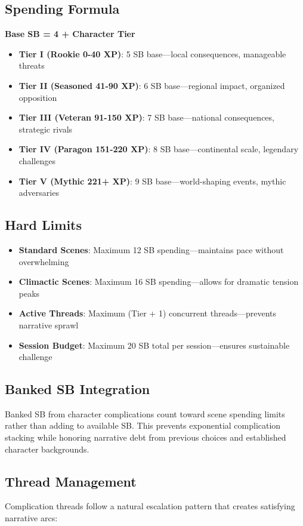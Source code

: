 \subsection*{Spending Formula}
\textbf{Base SB = 4 + Character Tier}
\begin{itemize}
    \item \textbf{Tier I (Rookie 0-40 XP)}: 5 SB base—local consequences, manageable threats
    \item \textbf{Tier II (Seasoned 41-90 XP)}: 6 SB base—regional impact, organized opposition
    \item \textbf{Tier III (Veteran 91-150 XP)}: 7 SB base—national consequences, strategic rivals
    \item \textbf{Tier IV (Paragon 151-220 XP)}: 8 SB base—continental scale, legendary challenges
    \item \textbf{Tier V (Mythic 221+ XP)}: 9 SB base—world-shaping events, mythic adversaries
\end{itemize}

\subsection*{Hard Limits}
\begin{itemize}
    \item \textbf{Standard Scenes}: Maximum 12 SB spending—maintains pace without overwhelming
    \item \textbf{Climactic Scenes}: Maximum 16 SB spending—allows for dramatic tension peaks
    \item \textbf{Active Threads}: Maximum (Tier + 1) concurrent threads—prevents narrative sprawl
    \item \textbf{Session Budget}: Maximum 20 SB total per session—ensures sustainable challenge
\end{itemize}

\subsection*{Banked SB Integration}
Banked SB from character complications count toward scene spending limits rather than adding to available SB. This prevents exponential complication stacking while honoring narrative debt from previous choices and established character backgrounds.

\subsection*{Thread Management}
Complication threads follow a natural escalation pattern that creates satisfying narrative arcs:

